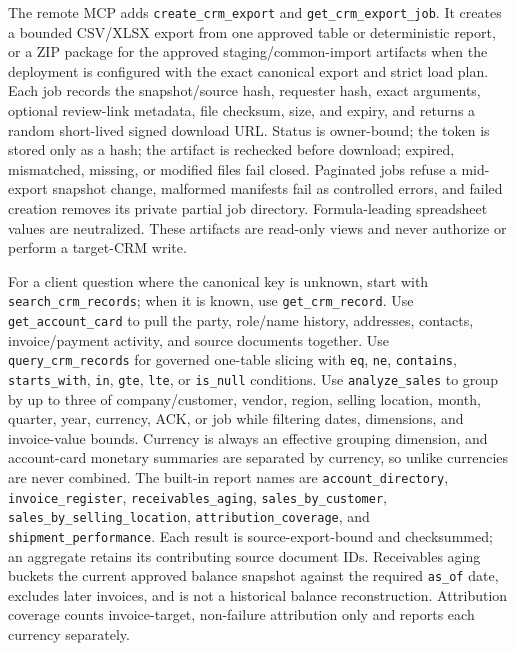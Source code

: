 \documentclass[
]{article}
\begin{document}
The remote MCP adds
\texttt{create\_\allowbreak{}crm\_\allowbreak{}export} and
\texttt{get\_\allowbreak{}crm\_\allowbreak{}export\_\allowbreak{}job}.
It creates a bounded CSV/XLSX export from one approved table or
deterministic report, or a ZIP package for the approved
staging/common-import artifacts when the deployment is configured with
the exact canonical export and strict load plan. Each job records the
snapshot/source hash, requester hash, exact arguments, optional
review-link metadata, file checksum, size, and expiry, and returns a
random short-lived signed download URL. Status is owner-bound; the token
is stored only as a hash; the artifact is rechecked before download;
expired, mismatched, missing, or modified files fail closed. Paginated
jobs refuse a mid-export snapshot change, malformed manifests fail as
controlled errors, and failed creation removes its private partial job
directory. Formula-leading spreadsheet values are neutralized. These
artifacts are read-only views and never authorize or perform a
target-CRM write.

For a client question where the canonical key is unknown, start with
\texttt{search\_\allowbreak{}crm\_\allowbreak{}records}; when it is
known, use \texttt{get\_\allowbreak{}crm\_\allowbreak{}record}. Use
\texttt{get\_\allowbreak{}account\_\allowbreak{}card} to pull the party,
role/name history, addresses, contacts, invoice/payment activity, and
source documents together. Use
\texttt{query\_\allowbreak{}crm\_\allowbreak{}records} for governed
one-table slicing with \texttt{eq}, \texttt{ne}, \texttt{contains},
\texttt{starts\_\allowbreak{}with}, \texttt{in}, \texttt{gte},
\texttt{lte}, or \texttt{is\_\allowbreak{}null} conditions. Use
\texttt{analyze\_\allowbreak{}sales} to group by up to three of
company/customer, vendor, region, selling location, month, quarter,
year, currency, ACK, or job while filtering dates, dimensions, and
invoice-value bounds. Currency is always an effective grouping
dimension, and account-card monetary summaries are separated by
currency, so unlike currencies are never combined. The built-in report
names are \texttt{account\_\allowbreak{}directory},
\texttt{invoice\_\allowbreak{}register},
\texttt{receivables\_\allowbreak{}aging},
\texttt{sales\_\allowbreak{}by\_\allowbreak{}customer},
\texttt{sales\_\allowbreak{}by\_\allowbreak{}selling\_\allowbreak{}location},
\texttt{attribution\_\allowbreak{}coverage}, and
\texttt{shipment\_\allowbreak{}performance}. Each result is
source-export-bound and checksummed; an aggregate retains its
contributing source document IDs. Receivables aging buckets the current
approved balance snapshot against the required
\texttt{as\_\allowbreak{}of} date, excludes later invoices, and is not a
historical balance reconstruction. Attribution coverage counts
invoice-target, non-failure attribution only and reports each currency
separately.
\end{document}
